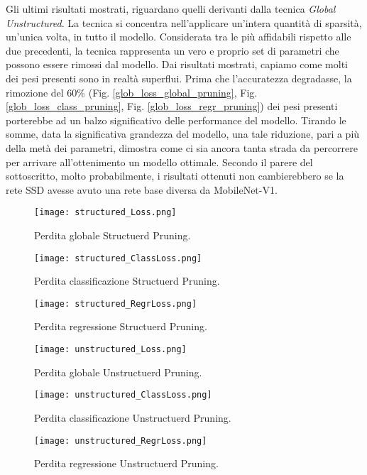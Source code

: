 Gli ultimi risultati mostrati, riguardano quelli derivanti dalla tecnica \emph{Global Unstructured}. La tecnica si concentra nell'applicare un'intera quantità di sparsità, un'unica volta, in tutto il modello. Considerata tra le più affidabili rispetto alle due precedenti, la tecnica rappresenta un vero e proprio set di parametri che possono essere rimossi dal modello. Dai risultati mostrati, capiamo come molti dei pesi presenti sono in realtà superflui. Prima che l'accuratezza degradasse, la rimozione del 60\% (Fig. \ref{glob_loss_global_pruning}, Fig. \ref{glob_loss_class_pruning}, Fig. \ref{glob_loss_regr_pruning}) dei pesi presenti porterebbe ad un balzo significativo delle performance del modello.
Tirando le somme, data la significativa grandezza del modello, una tale riduzione, pari a più della metà dei parametri, dimostra come ci sia ancora tanta strada da percorrere per arrivare all'ottenimento un modello ottimale. Secondo il parere del sottoscritto, molto probabilmente, i risultati ottenuti non cambierebbero se la rete SSD avesse avuto una rete base diversa da MobileNet-V1.
\begin{figure}
    \centering
    \texttt{[image: structured\_Loss.png]}
    \centering
    \caption{Perdita globale Structuerd Pruning.}
    \label{struct_loss_global_pruning}
\end{figure}
\begin{figure}
    \centering
    \texttt{[image: structured\_ClassLoss.png]}
    \centering
    \caption{Perdita classificazione Structuerd Pruning.}
    \label{struct_loss_class_pruning}
\end{figure}
\begin{figure}
    \centering
    \texttt{[image: structured\_RegrLoss.png]}
    \centering
    \caption{Perdita regressione Structuerd Pruning.}
    \label{struct_loss_regr_pruning}
\end{figure}
\begin{figure}
    \centering
    \texttt{[image: unstructured\_Loss.png]}
    \centering
    \caption{Perdita globale Unstructuerd Pruning.}
    \label{unstr_loss_global_pruning}
\end{figure}
\begin{figure}
    \centering
    \texttt{[image: unstructured\_ClassLoss.png]}
    \centering
    \caption{Perdita classificazione Unstructuerd Pruning.}
    \label{unstr_loss_class_pruning}
\end{figure}
\begin{figure}
    \centering
    \texttt{[image: unstructured\_RegrLoss.png]}
    \centering
    \caption{Perdita regressione Unstructuerd Pruning.}
    \label{unstr_loss_regr_pruning}
\end{figure}
